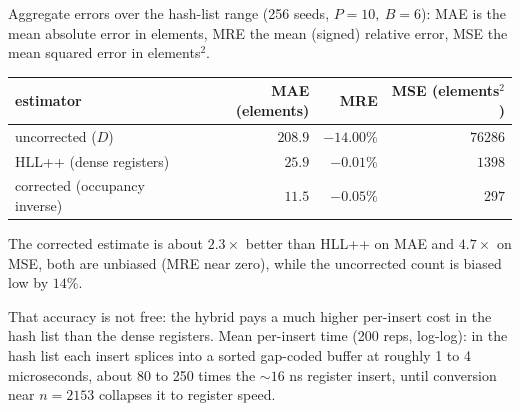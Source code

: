\medskip
\noindent Aggregate errors over the hash-list range (256 seeds, $P=10,\ B=6$): MAE is the mean absolute error in elements, MRE the mean (signed) relative error, MSE the mean squared error in elements$^2$.
\begin{center}
\begin{tabular}{lrrr}
\hline
estimator & MAE (elements) & MRE & MSE (elements$^2$)\\
\hline
uncorrected ($D$)            & $208.9$ & $-14.00\%$ & $76286$\\
HLL++ (dense registers)      & $25.9$  & $-0.01\%$  & $1398$\\
corrected (occupancy inverse)& $11.5$  & $-0.05\%$  & $297$\\
\hline
\end{tabular}
\end{center}
\noindent The corrected estimate is about $2.3\times$ better than HLL++ on MAE and $4.7\times$ on MSE, both are unbiased (MRE near zero), while the uncorrected count is biased low by $14\%$.

\medskip
\noindent That accuracy is not free: the hybrid pays a much higher per-insert cost in the hash list than the dense registers. Mean per-insert time (200 reps, log-log): in the hash list each insert splices into a sorted gap-coded buffer at roughly 1 to 4 microseconds, about 80 to 250 times the $\sim 16$ ns register insert, until conversion near $n=2153$ collapses it to register speed.
\begin{center}
\end{center}

